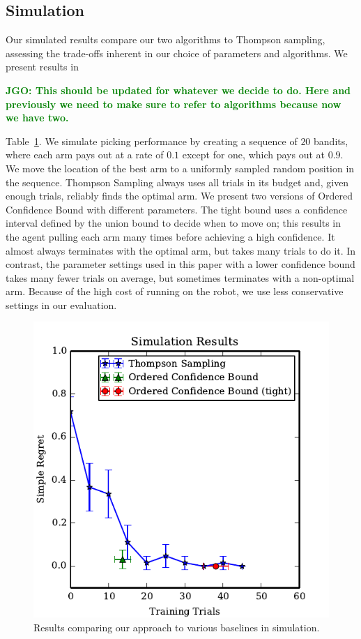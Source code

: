 \documentclass{article}
\newcommand{\jgonote}[1]{\textcolor{green}{\textbf{JGO: #1}}}
\newcommand{\algorithmCTxt}{Ordered Confidence Bound\xspace}
\begin{document}
\subsection{Simulation}
Our simulated results compare our two algorithms to Thompson sampling, 
assessing the trade-offs inherent in our choice
of parameters and algorithms.  We present results in

\jgonote{This should be updated for whatever we decide to do. Here and
previously we need to make sure to refer to algorithms because now we
have two.}

Table~\ref{fig:simulation_results}.  We simulate picking performance
by creating a sequence of $20$ bandits, where each arm pays out at a
rate of $0.1$ except for one, which pays out at $0.9$.  We move the
location of the best arm to a uniformly sampled random position in the
sequence.  Thompson Sampling always uses all trials in its budget and,
given enough trials, reliably finds the optimal arm.  We present two
versions of \algorithmCTxt with different parameters.  The tight
bound uses a confidence interval defined by the union bound to decide
when to move on; this results in the agent pulling each arm many times
before achieving a high confidence.  It almost always terminates with
the optimal arm, but takes many trials to do it.  In contrast, the
parameter settings used in this paper with a lower confidence bound
takes many fewer trials on average, but sometimes terminates with a
non-optimal arm.  Because of the high cost of running on the robot, we
use less conservative settings in our evaluation.



\begin{figure}
\includegraphics{figures/bestarm.pdf}
\caption{Results comparing our approach to various baselines in simulation.\label{fig:simulation_results}}
\end{figure}
\end{document}
